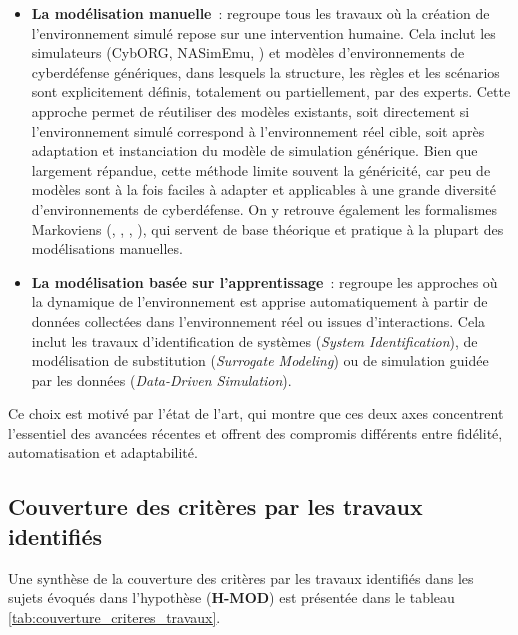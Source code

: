 \begin{itemize}
    \item \textbf{La modélisation manuelle}~: regroupe tous les travaux où la création de l’environnement simulé repose sur une intervention humaine. Cela inclut les simulateurs (CybORG, NASimEmu, ) et modèles d’environnements de cyberdéfense génériques, dans lesquels la structure, les règles et les scénarios sont explicitement définis, totalement ou partiellement, par des experts. Cette approche permet de réutiliser des modèles existants, soit directement si l’environnement simulé correspond à l’environnement réel cible, soit après adaptation et instanciation du modèle de simulation générique. Bien que largement répandue, cette méthode limite souvent la généricité, car peu de modèles sont à la fois faciles à adapter et applicables à une grande diversité d’environnements de cyberdéfense. On y retrouve également les formalismes Markoviens (, , , ), qui servent de base théorique et pratique à la plupart des modélisations manuelles.
    \item \textbf{La modélisation basée sur l'apprentissage}~: regroupe les approches où la dynamique de l’environnement est apprise automatiquement à partir de données collectées dans l’environnement réel ou issues d’interactions. Cela inclut les travaux d’identification de systèmes (\textit{System Identification}), de modélisation de substitution (\textit{Surrogate Modeling}) ou de simulation guidée par les données (\textit{Data-Driven Simulation}).
\end{itemize}

Ce choix est motivé par l’état de l’art, qui montre que ces deux axes concentrent l’essentiel des avancées récentes et offrent des compromis différents entre fidélité, automatisation et adaptabilité.

\subsection*{Couverture des critères par les travaux identifiés}

Une synthèse de la couverture des critères par les travaux identifiés dans les sujets évoqués dans l'hypothèse (\textbf{H-MOD}) est présentée dans le tableau \ref{tab:couverture_criteres_travaux}.

